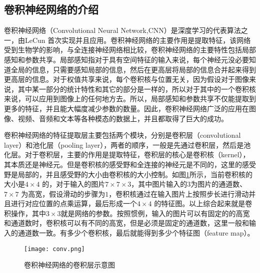 \subsection{卷积神经网络的介绍}
卷积神经网络（Convolutional Neural Network,CNN）是深度学习的代表算法之一，由LeCun 首次实现并且应用。卷积神经网络的主要作用是提取特征，该网络受到生物学的影响，与全连接神经网络相比较，卷积神经网络的主要特性包括局部感知和参数共享。局部感知指对于具有空间特征的输入来说，每个神经元没必要知道全局的信息，只需要感知局部的信息，然后在更高层将局部的信息合并起来得到更高层的信息。对于权值共享来说，每个卷积核与位置无关，因为假设对于图像来说，其中某一部分的统计特性和其它的部分是一样的，所以对于其中的一个卷积核来说，可以应用到图像上的任何地方去。所以，局部感知和参数共享不仅能提取到更多的特征，并且能大幅度减少参数的数量。因此，卷积神经网络广泛的应用在图像、视频、音频和文本等各种模态的数据上，并且都取得了巨大的成功。

卷积神经网络的特征提取层主要包括两个模块，分别是卷积层（convolutional layer）和池化层（pooling layer），两者的顺序，一般是先通过卷积层，然后是池化层。对于卷积层，主要的作用是提取特征，卷积层的核心是卷积核（kernel），其本质还是神经元。但是卷积核的感受野和全连接的神经元是不同的，这里的感受野是局部的，并且感受野的大小由卷积核的大小控制。如图\ref{fig:conv-example}所示，当前卷积核的大小是$4 \times 4$ 的，对于输入的图片$7 \times 7 \times 3$，其中图片输入的3为图片的通道数、$7 \times 7$ 为高宽，假设滑动的步骤为$1$，卷积核通过在输入图片上按照步长进行滑动并且进行对应位置的点乘运算，最后形成一个$4 \times 4$ 的特征图。以上综合起来就是卷积操作，其中$3 \times 3$就是网络的参数。按照惯例，输入的图片可以有固定的的高宽和通道数时，卷积核可以有不同的高宽，但是必须是固定的通道数，这里一般和输入的通道数一致。有多少个卷积核，最后就能得到多少个特征图（feature map）。
\begin{figure}[htpb]
	\centering
	\texttt{[image: conv.png]}
    \caption{卷积神经网络的卷积层示意图}
	\vspace*{-3.5mm}
	\label{fig:conv-example}
\end{figure}


